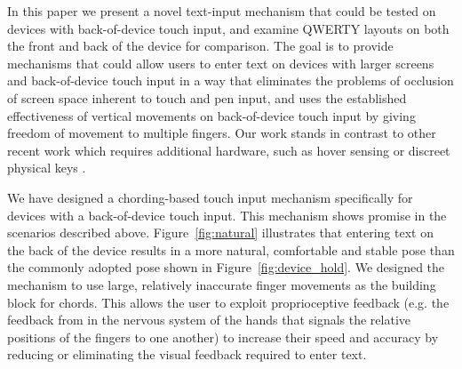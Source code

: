 In this paper we present a novel text-input mechanism that could be
tested on devices with back-of-device touch input, and examine QWERTY
layouts on both the front and back of the device for comparison. The
goal is to provide mechanisms that could allow users to enter text on
devices with larger screens and back-of-device touch input in a way
that eliminates the problems of occlusion of screen space inherent to
touch and pen input, and uses the established effectiveness of
vertical movements on back-of-device touch input 
by giving freedom of movement to multiple fingers.  Our work stands in
contrast to other recent work which requires additional hardware, such
as hover sensing  or discreet physical keys
\cite{RearType}.

We have designed a chording-based touch input mechanism specifically for devices with a back-of-device touch input.  This mechanism shows promise in the scenarios described above.  Figure~\ref{fig:natural} illustrates that entering text on the back of the device results in a more natural, comfortable and stable pose than the commonly adopted pose shown in Figure~\ref{fig:device_hold}.  We designed the mechanism to use large, relatively inaccurate finger movements as the building
block for chords.  This allows the user to exploit proprioceptive feedback (e.g. the feedback from in the nervous system of the hands that signals the relative positions of the fingers to one another) to
increase their speed and accuracy by reducing or eliminating the visual feedback required to enter text. 

